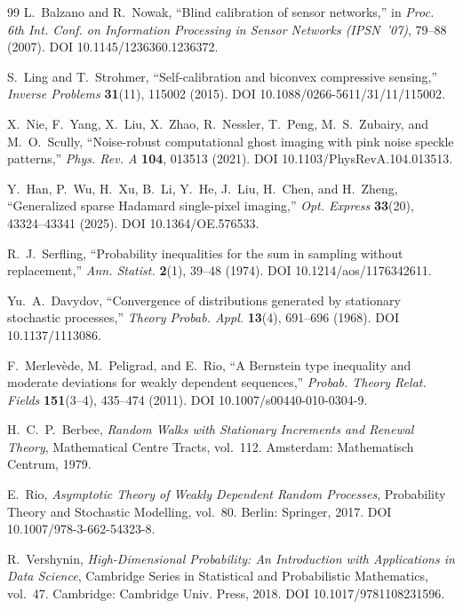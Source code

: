 \begin{thebibliography}{99}
L.~Balzano and R.~Nowak, ``Blind calibration of sensor networks,'' in \emph{Proc. 6th Int. Conf. on Information Processing in Sensor Networks (IPSN~'07)}, 79--88 (2007). DOI 10.1145/1236360.1236372.

S.~Ling and T.~Strohmer, ``Self-calibration and biconvex compressive sensing,'' \emph{Inverse Problems} \textbf{31}(11), 115002 (2015). DOI 10.1088/0266-5611/31/11/115002.

X.~Nie, F.~Yang, X.~Liu, X.~Zhao, R.~Nessler, T.~Peng, M.~S.~Zubairy, and M.~O.~Scully, ``Noise-robust computational ghost imaging with pink noise speckle patterns,'' \emph{Phys. Rev. A} \textbf{104}, 013513 (2021). DOI 10.1103/PhysRevA.104.013513.

Y.~Han, P.~Wu, H.~Xu, B.~Li, Y.~He, J.~Liu, H.~Chen, and H.~Zheng, ``Generalized sparse Hadamard single-pixel imaging,'' \emph{Opt. Express} \textbf{33}(20), 43324--43341 (2025). DOI 10.1364/OE.576533.


R.~J.~Serfling, ``Probability inequalities for the sum in sampling without replacement,'' \emph{Ann. Statist.} \textbf{2}(1), 39--48 (1974). DOI 10.1214/aos/1176342611.

Yu.~A.~Davydov, ``Convergence of distributions generated by stationary stochastic processes,'' \emph{Theory Probab. Appl.} \textbf{13}(4), 691--696 (1968). DOI 10.1137/1113086.

F.~Merlev\`ede, M.~Peligrad, and E.~Rio, ``A Bernstein type inequality and moderate deviations for weakly dependent sequences,'' \emph{Probab. Theory Relat. Fields} \textbf{151}(3--4), 435--474 (2011). DOI 10.1007/s00440-010-0304-9.

H.~C.~P.~Berbee, \emph{Random Walks with Stationary Increments and Renewal Theory}, Mathematical Centre Tracts, vol.~112. Amsterdam: Mathematisch Centrum, 1979.

E.~Rio, \emph{Asymptotic Theory of Weakly Dependent Random Processes}, Probability Theory and Stochastic Modelling, vol.~80. Berlin: Springer, 2017. DOI 10.1007/978-3-662-54323-8.

R.~Vershynin, \emph{High-Dimensional Probability: An Introduction with Applications in Data Science}, Cambridge Series in Statistical and Probabilistic Mathematics, vol.~47. Cambridge: Cambridge Univ. Press, 2018. DOI 10.1017/9781108231596.


\end{thebibliography}
